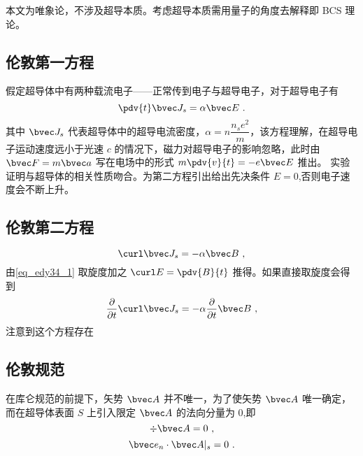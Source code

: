 

本文为唯象论，不涉及超导本质。考虑超导本质需用量子的角度去解释即 BCS 理论。
\subsection{伦敦第一方程}
假定超导体中有两种载流电子——正常传到电子与超导电子，对于超导电子有
\begin{equation}
\pdv{t}\bvec J_s=\alpha\bvec E \label{eq_edy34_1}~.
\end{equation}
其中 $\bvec J_s$ 代表超导体中的超导电流密度，$\alpha=n\dfrac {n_se^2}m$，该方程理解，在超导电子运动速度远小于光速 $c$ 的情况下，磁力对超导电子的影响忽略，此时由 $\bvec F=m \bvec a$ 写在电场中的形式 $m\pdv{v}{t}=-e\bvec E$ 推出。
实验证明与超导体的相关性质吻合。为第二方程引出给出先决条件 $E=0$,否则电子速度会不断上升。
\subsection{伦敦第二方程}
\begin{equation}
\curl\bvec J_s=-\alpha\bvec B \label{eq_edy34_2}~,
\end{equation}
由\autoref{eq_edy34_1} 取旋度加之 $\curl E=\pdv{B}{t}$ 推得。如果直接取旋度会得到
\begin{equation}
\frac{\partial}{\partial t} \curl \bvec J_s = -\alpha \frac{\partial}{\partial t}\bvec B~,
\end{equation}
注意到这个方程存在
\subsection{伦敦规范}
在库仑规范的前提下，矢势 $\bvec A$ 并不唯一，为了使矢势 $\bvec A$ 唯一确定，而在超导体表面 $S$ 上引入限定 $\bvec A$ 的法向分量为 $0$,即
\begin{equation}
\div \bvec A=0~,
\end{equation}
\begin{equation}
\bvec e_n \cdot \bvec A|_s=0~.
\end{equation}
